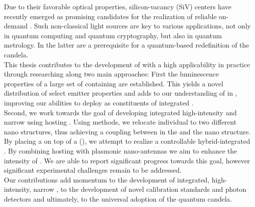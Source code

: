 	Due to their favorable optical properties, silicon-vacancy (SiV) centers have recently emerged as promising candidates for the realization of reliable on-demand \spss. Such non-classical light sources are key to various applications, not only in quantum computing and quantum cryptography, but also in quantum metrology. In the latter \spss are a prerequisite for a quantum-based redefinition of the candela.
	\\
	This thesis contributes to the development of \spss with a high applicability in practice through researching \sivs along two main approaches: First the luminescence properties of a large set of \nds containing \sivs are established. This yields a novel distribution of select emitter properties and adds to our understanding of \sivs in \nds, improving our abilities to deploy \sivs as constituents of integrated \spss.
	\\
	Second, we work towards the goal of developing integrated high-intensity and narrow \lw \spss using \nds hosting \sivs. Using \pp methods, we relocate individual \nds to two different nano structures, thus achieving a coupling between \sivs in the \nd and the nano structure. By placing a \nd on top of a \vcsel (\VCSEL), we attempt to realize a controllable hybrid-integrated \sps. By combining \nds hosting \sivs with plasmonic nano-antennas we aim to enhance the \pl intensity of \sivs. We are able to report significant progress towards this goal, however significant experimental challenges remain to be addressed.
	\\
	Our contributions add momentum to the development of integrated, high-intensity, narrow \lw \spss, to the development of novel calibration standards and photon detectors and ultimately, to the universal adoption of the quantum candela.

\vfill
